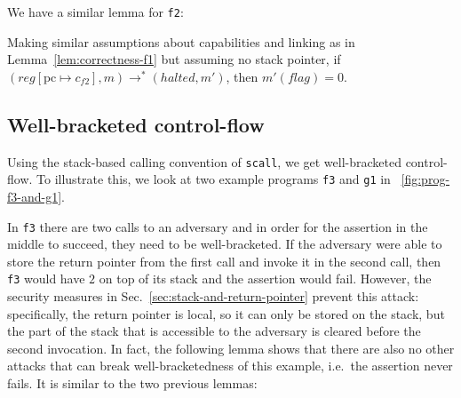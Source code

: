 \documentclass{llncs}
\newcommand{\sectionname}{Sec.}
\newcommand{\update}[2]{[#1 \mapsto #2]}
\newcommand{\var}[1]{\mathit{#1}}
\newcommand{\pcreg}{\mathrm{pc}}
\newcommand{\reg}{\var{reg}}
\newcommand{\flag}{\var{flag}}
\newcommand{\halted}{\mathit{halted}}
\newcommand{\step}[1][]{\rightarrow_{#1}}
\begin{document}
We have a similar lemma for \texttt{\footnotesize{f2}}:
\begin{lemma}
  \label{lem:correctness-f2}
  Making similar assumptions about capabilities and linking as in
  Lemma~\ref{lem:correctness-f1} but assuming no stack pointer,
  if $(\reg\update{\pcreg}{c_{f2}},m) \step^* (\halted,m')$, then $m'(\flag) = 0$.
\end{lemma}

\subsection{Well-bracketed control-flow} 
Using the stack-based calling convention of \texttt{\footnotesize{scall}}, we get
well-bracketed control-flow. To illustrate this, we look at
two example programs \texttt{\footnotesize{f3}} and
\texttt{\footnotesize{g1}} in \figurename~\ref{fig:prog-f3-and-g1}.

In \texttt{\footnotesize{f3}} there are two calls to an adversary and in order
for the assertion in the middle to succeed, they need to be well-bracketed. If
the adversary were able to store the return pointer from the first call and
invoke it in the second call, then \texttt{\footnotesize{f3}} would have $2$ on
top of its stack and the assertion would fail. However, the security measures in
\sectionname~\ref{sec:stack-and-return-pointer} prevent this attack: specifically,
the return pointer is local, so it can only be stored on the stack, but the part
of the stack that is accessible to the adversary is cleared before the second
invocation. In fact, the following lemma shows that there are also no other
attacks that can break well-bracketedness of this example, i.e.\ the assertion
never fails. It is similar to the two previous lemmas:
\end{document}

